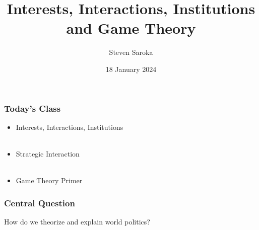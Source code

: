 \documentclass{beamer}
\title[The Three I's]{\LARGE{Interests, Interactions, Institutions and Game Theory}}
\author[POLI 150]{Steven Saroka}
\institute{POLI 150}
\date{18 January 2024}
\begin{document}
\begin{frame}
\titlepage %
\end{frame}









\begin{frame} 
	\frametitle{\LARGE{Today's Class}}
	\begin{itemize}
			\item Interests, Interactions, Institutions
			\\~\\ 
			\item Strategic Interaction 
			\\~\\
			\item Game Theory Primer
	\end{itemize}
\end{frame}

\begin{frame} 
	\frametitle{\LARGE{Central Question}}
	\begin{center}
	    	\LARGE How do we theorize and explain world politics? 
   	\end{center}
\end{frame}
\end{document}
